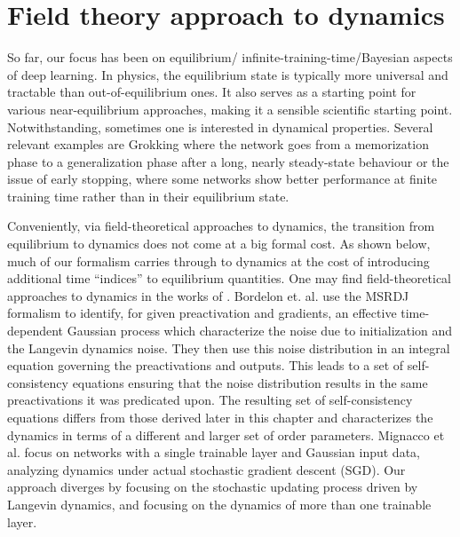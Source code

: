 \chapter{Field theory approach to dynamics}
\label{Sec:MSRDJ}
So far, our focus has been on equilibrium/ infinite-training-time/Bayesian aspects of deep learning. In physics, the equilibrium state is typically more universal and tractable than out-of-equilibrium ones. It also serves as a starting point for various near-equilibrium approaches, making it a sensible scientific starting point. Notwithstanding, sometimes one is interested in dynamical properties. Several relevant examples are Grokking \citep{power2022grokking,rubin2024grokking} where the network goes from a memorization phase to a generalization phase after a long, nearly steady-state behaviour or the issue of early stopping, where some networks show better performance at finite training time rather than in their equilibrium state. %

Conveniently, via field-theoretical approaches to dynamics, the transition from equilibrium to dynamics does not come at a big formal cost. As shown below, much of our formalism carries through to dynamics at the cost of introducing additional time “indices” to equilibrium quantities. One may find field-theoretical approaches to dynamics in the works of \citep{bordelon2022self, Bordelon2023Dynamics, mignacco2020dynamical}. Bordelon et. al. use the MSRDJ formalism to identify, for given preactivation and gradients, an effective time-dependent Gaussian process which characterize the noise due to initialization and the Langevin dynamics noise. They then use this noise distribution in an integral equation governing the preactivations and outputs. This leads to a set of self-consistency equations ensuring that the noise distribution results in the same preactivations it was predicated upon. 
The resulting set of self-consistency equations differs from those derived later in this chapter and characterizes the dynamics in terms of a different and larger set of order parameters. Mignacco et al. focus on networks with a single trainable layer and Gaussian input data, analyzing dynamics under actual stochastic gradient descent (SGD). Our approach diverges by focusing on the stochastic updating process driven by Langevin dynamics, and focusing on the dynamics of more than one trainable layer. %

